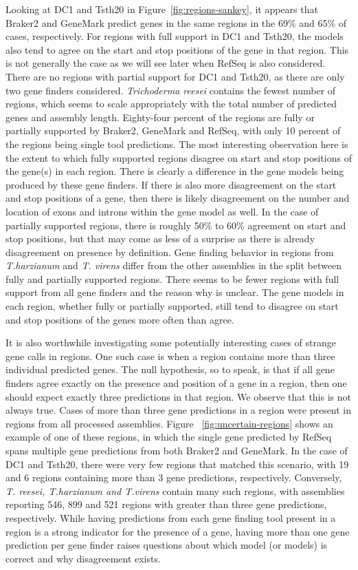 Looking at DC1 and Tsth20 in Figure~\ref{fig:regions-sankey}, it
appears that Braker2 and GeneMark predict genes in the same regions in
the 69\% and 65\% of cases, respectively. For regions with full
support in DC1 and Tsth20, the models also tend to agree on the start
and stop positions of the gene in that region. This is not generally
the case as we will see later when RefSeq is also considered. There
are no regions with partial support for DC1 and Tsth20, as there are
only two gene finders considered. \textit{Trichoderma reesei} contains
the fewest number of regions, which seems to scale appropriately with
the total number of predicted genes and assembly length. Eighty-four
percent of the regions are fully or partially supported by Braker2,
GeneMark and RefSeq, with only 10 percent of the regions being single
tool predictions. The most interesting observation here is the extent
to which fully supported regions disagree on start and stop positions
of the gene(s) in each region. There is clearly a difference in the
gene models being produced by these gene finders. If there is also
more disagreement on the start and stop positions of a gene, then
there is likely disagreement on the number and location of exons and
introns within the gene model as well. In the case of partially
supported regions, there is roughly 50\% to 60\% agreement on start
and stop positions, but that may come as less of a surprise as there
is already disagreement on presence by definition. Gene finding
behavior in regions from \textit{T.harzianum} and \textit{T. virens}
differ from the other assemblies in the split between fully and
partially supported regions. There seems to be fewer regions with full
support from all gene finders and the reason why is unclear. The gene
models in each region, whether fully or partially supported, still
tend to disagree on start and stop positions of the genes more often
than agree.

It is also worthwhile investigating some potentially interesting cases
of strange gene calls in regions. One such case is when a region
contains more than three individual predicted genes. The null
hypothesis, so to speak, is that if all gene finders agree exactly on
the presence and position of a gene in a region, then one should
expect exactly three predictions in that region. We observe that this
is not always true. Cases of more than three gene predictions in a
region were present in regions from all processed assemblies. Figure
~\ref{fig:uncertain-regions} shows an example of one of these regions,
in which the single gene predicted by RefSeq spans multiple gene
predictions from both Braker2 and GeneMark. In the case of DC1 and
Tsth20, there were very few regions that matched this scenario, with
19 and 6 regions containing more than 3 gene predictions,
respectively. Conversely, \textit{T. reesei, T.harzianum and T.virens}
contain many such regions, with assemblies reporting 546, 899 and 521
regions with greater than three gene predictions, respectively. While
having predictions from each gene finding tool present in a region is
a strong indicator for the presence of a gene, having more than one
gene prediction per gene finder raises questions about which model (or
models) is correct and why disagreement exists.

